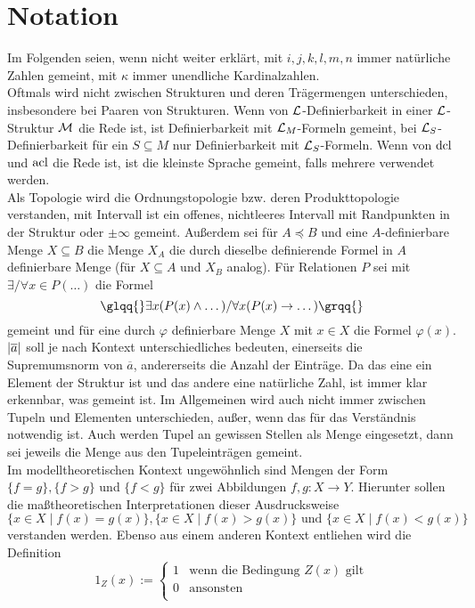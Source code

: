 \chapter*{Notation}
Im Folgenden seien, wenn nicht weiter erklärt, mit $i,j,k,l,m,n$ immer natürliche Zahlen gemeint, mit $\kappa$ immer unendliche Kardinalzahlen.\\
Oftmals wird nicht zwischen Strukturen und deren Trägermengen unterschieden, insbesondere bei Paaren von Strukturen. Wenn von $\mathcal{L}$-Definierbarkeit in einer $\mathcal{L}$-Struktur $\mathcal{M}$ die Rede ist, ist Definierbarkeit mit $\mathcal{L}_M$-Formeln gemeint, bei $\mathcal{L}_S$-Definierbarkeit für ein $S\subseteq M$ nur Definierbarkeit mit $\mathcal{L}_S$-Formeln. Wenn von $\operatorname{dcl}$ und $\operatorname{acl}$ die Rede ist, ist die kleinste Sprache gemeint, falls mehrere verwendet werden.\\
Als Topologie wird die Ordnungstopologie bzw. deren Produkttopologie verstanden, mit \glqq{}Intervall\grqq{} ist ein offenes, nichtleeres Intervall mit Randpunkten in der Struktur oder $\pm\infty$ gemeint. Außerdem sei für $A\preceq B$ und eine $A$-definierbare Menge $X\subseteq B$ die Menge $X_A$ die durch dieselbe definierende Formel in $A$ definierbare Menge (für $X\subseteq A$ und $X_B$ analog). Für Relationen $P$ sei mit \glqq{}$\exists/\forall x\in P(\dots)$\grqq{} die Formel $$\glqq{}\exists x(P(x)\land\dots)/\forall x(P(x)\rightarrow\dots)\grqq{}$$ gemeint und für eine durch $\varphi$ definierbare Menge $X$ mit \glqq{}$x\in X$\grqq{} die Formel $\varphi(x)$.\\
${\left| \overline{a} \right|}$ soll je nach Kontext unterschiedliches bedeuten, einerseits die Supremumsnorm von $\overline{a}$, andererseits die Anzahl der Einträge. Da das eine ein Element der Struktur ist und das andere eine natürliche Zahl, ist immer klar erkennbar, was gemeint ist. Im Allgemeinen wird auch nicht immer zwischen Tupeln und Elementen unterschieden, außer, wenn das für das Verständnis notwendig ist. Auch werden Tupel an gewissen Stellen als Menge eingesetzt, dann sei jeweils die Menge aus den Tupeleinträgen gemeint.\\
Im modelltheoretischen Kontext ungewöhnlich sind Mengen der Form $\{f=g\},\{f>g\}$ und $\{f<g\}$ für zwei Abbildungen $f,g:X\rightarrow Y$. Hierunter sollen die maßtheoretischen Interpretationen dieser Ausdrucksweise $$\{x\in X\mid f(x)=g(x)\},\{x\in X\mid f(x)>g(x)\}\text{ und }\{x\in X\mid f(x)<g(x)\}$$ verstanden werden. Ebenso aus einem anderen Kontext entliehen wird die Definition
$$1_Z(x):=\left\{\begin{array}{ll}
1&\text{wenn die Bedingung }Z(x)\text{ gilt}\\
0&\text{ansonsten}\\
\end{array}\right.$$